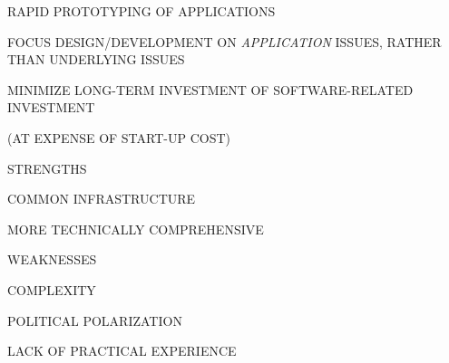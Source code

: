 \begin{bwslide}

\begin{nrtc}
\item	RAPID PROTOTYPING OF APPLICATIONS

\item	FOCUS DESIGN/DEVELOPMENT ON \emph{APPLICATION} ISSUES,
	RATHER THAN UNDERLYING ISSUES

\item	MINIMIZE LONG-TERM INVESTMENT OF SOFTWARE-RELATED INVESTMENT
    \begin{nrtc}
    \item	(AT EXPENSE OF START-UP COST)
    \end{nrtc}
\end{nrtc}
\end{bwslide}


\begin{bwslide}

\end{bwslide}




\begin{bwslide}

\begin{nrtc}
\item	STRENGTHS
    \begin{nrtc}
    \item	COMMON INFRASTRUCTURE

    \item	MORE TECHNICALLY COMPREHENSIVE
    \end{nrtc}

\item	WEAKNESSES
    \begin{nrtc}
    \item	COMPLEXITY

    \item	POLITICAL POLARIZATION

    \item	LACK OF PRACTICAL EXPERIENCE
    \end{nrtc}
\end{nrtc}
\end{bwslide}

